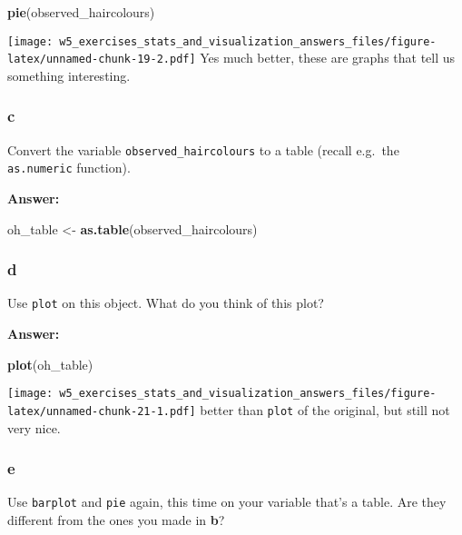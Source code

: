 \documentclass[]{article}
\newenvironment{Shaded}{\begin{snugshade}}{\end{snugshade}}
\newcommand{\KeywordTok}[1]{\textcolor[rgb]{0.13,0.29,0.53}{\textbf{#1}}}
\newcommand{\NormalTok}[1]{#1}
\newcommand{\StringTok}[1]{\textcolor[rgb]{0.31,0.60,0.02}{#1}}
\begin{document}
\begin{Shaded}
\begin{Highlighting}[]
\KeywordTok{pie}\NormalTok{(observed_haircolours)}
\end{Highlighting}
\end{Shaded}

\texttt{[image: w5\_exercises\_stats\_and\_visualization\_answers\_files/figure-latex/unnamed-chunk-19-2.pdf]}
Yes much better, these are graphs that tell us something interesting.

\hypertarget{c-4}{%
\subsubsection{c}\label{c-4}}

Convert the variable \texttt{observed\_haircolours} to a table (recall
e.g.~the \texttt{as.numeric} function).

\textbf{Answer:}

\begin{Shaded}
\begin{Highlighting}[]
\NormalTok{oh_table <-}\StringTok{ }\KeywordTok{as.table}\NormalTok{(observed_haircolours)}
\end{Highlighting}
\end{Shaded}

\hypertarget{d-3}{%
\subsubsection{d}\label{d-3}}

Use \texttt{plot} on this object. What do you think of this plot?

\textbf{Answer:}

\begin{Shaded}
\begin{Highlighting}[]
\KeywordTok{plot}\NormalTok{(oh_table)}
\end{Highlighting}
\end{Shaded}

\texttt{[image: w5\_exercises\_stats\_and\_visualization\_answers\_files/figure-latex/unnamed-chunk-21-1.pdf]}
better than \texttt{plot} of the original, but still not very nice.

\hypertarget{e-1}{%
\subsubsection{e}\label{e-1}}

Use \texttt{barplot} and \texttt{pie} again, this time on your variable
that's a table. Are they different from the ones you made in \textbf{b}?
\end{document}
